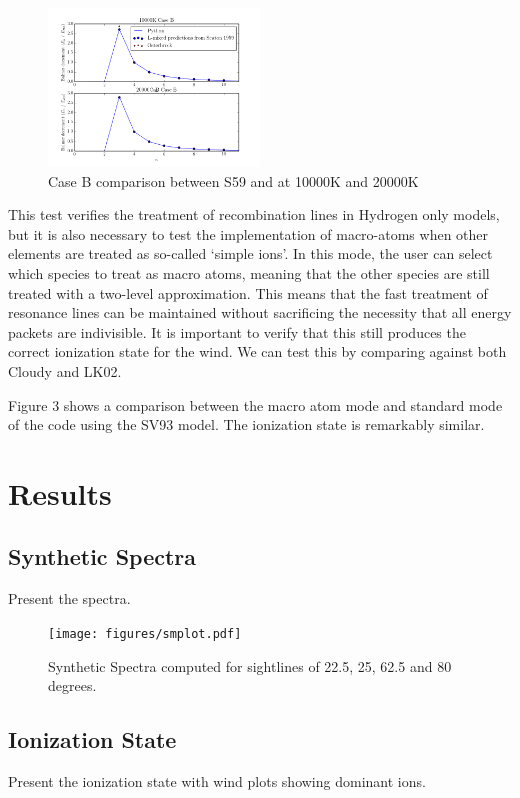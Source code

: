 \documentclass[useAMS,usenatbib, onecolumn]{mn2ejm}
\begin{document}
\begin{figure}
\includegraphics[width=0.5\textwidth]{figures/caseB.png}
\caption{Case B comparison between S59 and \py at 10000K and 20000K}
\end{figure}

This test verifies the treatment of recombination lines in Hydrogen only models, but it is also necessary to test the implementation
of macro-atoms when other elements are treated as so-called `simple ions'. In this mode, the user can select which species to treat as
macro atoms, meaning that the other species are still treated with a two-level approximation. This means that the fast treatment of
resonance lines can be maintained without sacrificing the necessity that all energy packets are indivisible. It is important to verify that 
this still produces the correct ionization state for the wind. We can test this by comparing against both {\textsc Cloudy} and LK02.

Figure 3 shows a comparison between the macro atom mode and standard mode of the code using the SV93 model. The ionization state is remarkably similar.


%
%

\section{Results}

\subsection{Synthetic Spectra}
Present the spectra.

\begin{figure}
\texttt{[image: figures/smplot.pdf]}
\caption{Synthetic Spectra computed for sightlines of 22.5, 25, 62.5 and 80 degrees.}
\end{figure}

\subsection{Ionization State}
Present the ionization state with wind plots showing dominant ions.
\end{document}
